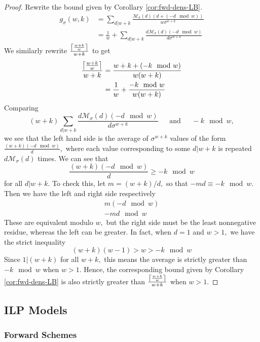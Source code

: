 \documentclass{article}
\DeclarePairedDelimiter\ceil{\lceil}{\rceil}
\begin{document}
\begin{proof}
\label{proof:simple-vs-complex}
Rewrite the bound given by Corollary \ref{cor:fwd-dens-LB}.
\begin{align*} 
g_\sigma(w,k)&= \sum_{d|w+k}\frac{\mathcal{M}_\sigma(d)(d+(-d \mod w))}{w\sigma^{w+k}}\\
&= \frac{1}{w} + \sum_{d|w+k}\frac{d\mathcal{M}_\sigma(d)(-d \mod w)}{d\sigma^{w+k}}
\end{align*}
We similarly rewrite $\frac{\ceil*{\frac{w+k}{w}}}{w+k}$ to get
\begin{align*} 
\frac{\ceil*{\frac{w+k}{w}}}{w+k}&= \frac{w+k+(-k \mod w)}{w(w+k)}\\
&=\frac{1}{w} + \frac{-k \mod w}{w(w+k)}
\end{align*}
Comparing $$(w+k)\sum_{d|w+k}\frac{d\mathcal{M}_\sigma(d)(-d \mod w)}{d\sigma^{w+k}}~~~~~~~\text{and}~~~~~~~-k \mod w,$$
we see that the left hand side is the average of $\sigma^{w+k}$ values of the form $\frac{(w+k)(-d \mod w)}{d},$ where each value corresponding to some $d|w+k$ is repeated $d\mathcal{M}_\sigma(d)$ times. We can see that
\begin{equation*}
\frac{(w+k)(-d \mod w)}{d} \geq -k \mod w
\end{equation*}
for all $d|w+k.$ To check this, let $m = (w+k)/d,$ so that $-md \equiv -k \mod w.$ Then we have the left and right side respectively 
\begin{align*}
m(-d \mod w)\\ 
-md \mod w
\end{align*} 
These are equivalent modulo $w,$ but the right side must be the least nonnegative residue, whereas the left can be greater. In fact, when $d = 1$ and $w > 1,$ we have the strict inequality 
\begin{equation*}
(w+k)(w-1) >w> -k \mod w
\end{equation*}
Since $1|(w+k)$ for all $w+k,$ this means the average is strictly greater than $-k \mod w$ when $w > 1$. Hence, the corresponding bound given by Corollary \ref{cor:fwd-dens-LB} is also strictly greater than $\frac{\ceil*{\frac{w+k}{w}}}{w+k}$ when $w > 1$.
\end{proof}


\subsection{ILP Models}
\label{appendix:ILP-desc}
\subsubsection{Forward Schemes}
\end{document}
